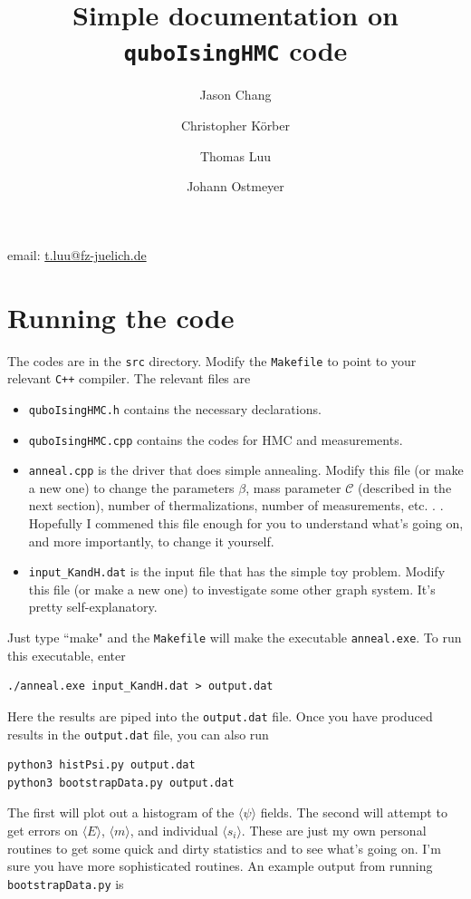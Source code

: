 \documentclass[11pt]{article}
\title{Simple documentation on \texttt{quboIsingHMC} code}
\author[1]{Jason Chang}
\author[1]{Christopher K\"orber}
\author[2,3]{Thomas Luu}
\author[3]{Johann Ostmeyer}
\affil[1]{LBL, Berkeley, California}
\affil[2]{Institute for Advanced Simulation 4\\
Forschungszentrum J\"ulich, Germany}
\affil[3]{HISKP, Rheinische Friedrich-Williams-Universit\"at Bonn, Germany}
\date{}                                           %
\begin{document}
\maketitle
\begin{center}
email: \href{mailto:t.luu@fz-juelich.de}{t.luu@fz-juelich.de}
\end{center}

\thispagestyle{fancy}

\clearpage{}

\section{Running the code}
The codes are in the \texttt{src} directory.  Modify the \texttt{Makefile} to point to your relevant \texttt{C++} compiler.  The relevant files are 
\begin{itemize}
\item \texttt{quboIsingHMC.h} contains the necessary declarations.
\item \texttt{quboIsingHMC.cpp} contains the codes for HMC and measurements.
\item \texttt{anneal.cpp} is the driver that does simple annealing.  Modify this file (or make a new one) to change the parameters $\beta$, mass parameter $\mathcal{C}$ (described in the next section), number of thermalizations, number of measurements, etc. . .  Hopefully I commened this file enough for you to understand what's going on, and more importantly, to change it yourself.
\item \texttt{input\_KandH.dat} is the input file that has the simple toy problem.  Modify this file (or make a new one) to investigate some other graph system.  It's pretty self-explanatory.
\end{itemize}
Just type ``make" and the \texttt{Makefile} will make the executable \texttt{anneal.exe}.  To run this executable, enter
\begin{lstlisting}
./anneal.exe input_KandH.dat > output.dat
\end{lstlisting}
Here the results are piped into the \texttt{output.dat} file.  Once you have produced results in the \texttt{output.dat} file, you can also run
\begin{lstlisting}
python3 histPsi.py output.dat
python3 bootstrapData.py output.dat
\end{lstlisting}
The first will plot out a histogram of the $\langle\psi\rangle$ fields.  The second will attempt to get errors on $\langle E\rangle$, $\langle m\rangle$, and individual $\langle s_i\rangle$.  These are just my own personal routines to get some quick and dirty statistics and to see what's going on.  I'm sure you have more sophisticated routines. An example output from running \texttt{bootstrapData.py} is
\end{document}
